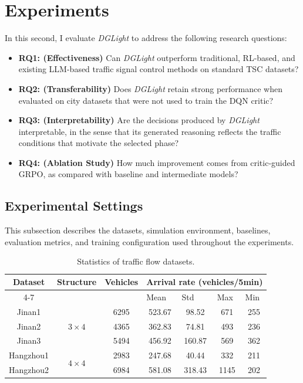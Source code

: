 \section{Experiments}
In this second, I evaluate \textit{DGLight} to address the following research questions:
\begin{itemize}
    \item \textbf{RQ1: (Effectiveness)} Can \textit{DGLight} outperform traditional, RL-based, and existing LLM-based traffic signal control methods on standard TSC datasets?
    \item \textbf{RQ2: (Transferability)} Does \textit{DGLight} retain strong performance when evaluated on city datasets that were not used to train the DQN critic?
    \item \textbf{RQ3: (Interpretability)} Are the decisions produced by \textit{DGLight} interpretable, in the sense that its generated reasoning reflects the traffic conditions that motivate the selected phase?
    \item \textbf{RQ4: (Ablation Study)} How much improvement comes from critic-guided GRPO, as compared with baseline and intermediate models?
\end{itemize}

\subsection{Experimental Settings}
This subsection describes the datasets, simulation environment, baselines, evaluation metrics, and training configuration used throughout the experiments.


\begin{table}[h]
    \centering
    \caption{Statistics of traffic flow datasets.}
    \vspace{-0.5em}
    \label{tab:dataset_summary}
    \begin{tabular}{ccccccc}
        \hline
        \multirow{2}{*}{Dataset} & \multirow{2}{*}{Structure} & \multirow{2}{*}{Vehicles} & \multicolumn{4}{c}{Arrival rate (vehicles/5min)} \\ \cline{4-7} 
        &  &  & \multicolumn{1}{l}{Mean} & \multicolumn{1}{l}{Std} & \multicolumn{1}{l}{Max} & \multicolumn{1}{l}{Min} \\ \hline
        Jinan1 & \multirow{3}{*}{$3 \times 4$} & 6295 & 523.67 & 98.52 & 671 & 255 \\
        Jinan2 &  & 4365 & 362.83 & 74.81 & 493 & 236 \\
        Jinan3 &  & 5494 & 456.92 & 160.87 & 569 & 362 \\ \hline
        Hangzhou1 & \multirow{2}{*}{$4 \times 4$} & 2983 & 247.68 & 40.44 & 332 & 211 \\
        Hangzhou2 &  & 6984 & 581.08 & 318.43 & 1145 & 202 \\ \hline
    \end{tabular}
\end{table}

